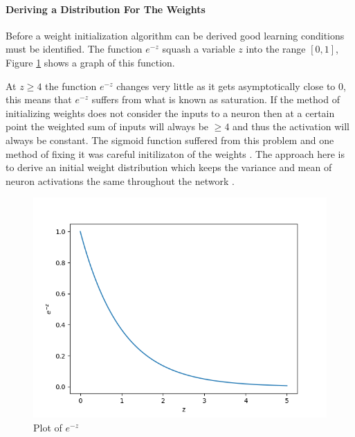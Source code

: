\paragraph{Deriving a Distribution For The Weights}
Before a weight initialization algorithm can be derived good learning conditions must be identified. The function $e^{-z}$ squash a variable $z$ into the range $[0,1]$, Figure \ref{fig:activation-plot} shows a graph of this function.\\
\noindent
\begin{minipage}[t]{0.55\textwidth}
\vspace{0px}
At $z \geq 4$ the function $e^{-z}$ changes very little as it gets asymptotically close to 0, this means that $e^{-z}$ suffers from what is known as saturation. If the method of initializing weights does not consider the inputs to a neuron then at a certain point the weighted sum of inputs will always be $\geq 4$ and thus the activation will always be constant. The sigmoid function suffered from this problem and one method of fixing it was careful initilizaton of the weights \cite{glorot2010understanding}. The approach here is to derive an initial weight distribution which keeps the variance and mean of neuron activations the same throughout the network \cite{kumar2017weight}. \\
\end{minipage}
\hspace{0.05\textwidth}
\begin{minipage}[t]{0.4\textwidth}
\vspace{0px}
\begin{figure}[H]
\vspace{0px}
    \includegraphics[width=\textwidth]{activation-plot.png}
    \caption{Plot of $e^{-z}$}
    \label{fig:activation-plot}
\end{figure}
\end{minipage}

